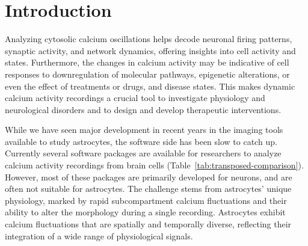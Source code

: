 \documentclass[utf8]{FrontiersinHarvard}
\newcommand{\tref}[1]{ (Table~\ref{tab:#1})}
\begin{document}
    \begin{acronym}
    \end{acronym}


    \section{Introduction}
    Analyzing cytosolic calcium oscillations helps decode neuronal firing patterns, synaptic activity, and network dynamics, offering insights into cell activity and states\citep{del_negro_sodium_2005,grienberger_imaging_2012,dombeck_imaging_2007}. Furthermore, the changes in calcium activity may be indicative of cell responses to downregulation of molecular pathways, epigenetic alterations, or even the effect of treatments or drugs, and disease states\citep{lines_astrocytes_2020,miller_calcium_2023,robil_glioblastoma_2015,huang_vitro_2013,britti_tau_2020,zhang_estrogen_2010}. This makes dynamic calcium activity recordings a crucial tool to investigate physiology and neurological disorders and to design and develop therapeutic interventions.

    While we have seen major development in recent years in the imaging tools available to study astrocytes, the software side has been slow to catch up\citep{gorzo_photonics_2022,aryal_er-gcamp6f_2022,stobart_cortical_2018}. Currently several software packages are available for researchers to analyze calcium activity recordings from brain cells\tref{transposed-comparison}. However, most of these packages are primarily developed for neurons, and are often not suitable for astrocytes. The challenge stems from astrocytes' unique physiology, marked by rapid subcompartment calcium fluctuations\citep{stobart_long-term_2018,curreli_complementary_2022} and their ability to alter the morphology during a single recording\citep{anders_epileptic_2024,baorto_astrocyte_1992}. Astrocytes exhibit calcium fluctuations that are spatially and temporally diverse, reflecting their integration of a wide range of physiological signals\citep{semyanov_making_2020,smedler_frequency_2014,denizot_simulation_2019,papouin_astrocytic_2017,bazargani_astrocyte_2016}.
\end{document}
